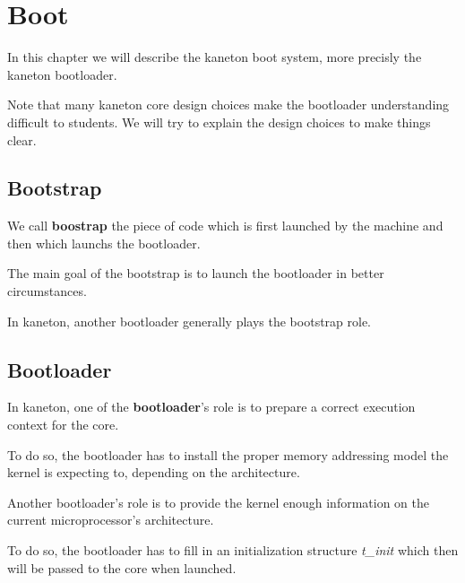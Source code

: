 
%
%

\chapter{Boot}

In this chapter we will describe the kaneton boot system, more precisly
the kaneton bootloader.

Note that many kaneton core design choices make the bootloader understanding
difficult to students. We will try to explain the design choices to make
things clear.

\newpage

%
%

%
%

\section{Bootstrap}

We call \textbf{boostrap} the piece of code which is first launched by the
machine and then which launchs the bootloader.

The main goal of the bootstrap is to launch the bootloader in better
circumstances.

In kaneton, another bootloader generally plays the bootstrap role.

%
%

\section{Bootloader}

In kaneton, one of the \textbf{bootloader}'s role is to prepare a correct
execution context for the core.

To do so, the bootloader has to install the proper memory addressing model
the kernel is expecting to, depending on the architecture.

Another bootloader's role is to provide the kernel enough information
on the current microprocessor's architecture.

To do so, the bootloader has to fill in an initialization structure
\textit{t\_init} which then will be passed to the core when launched.


